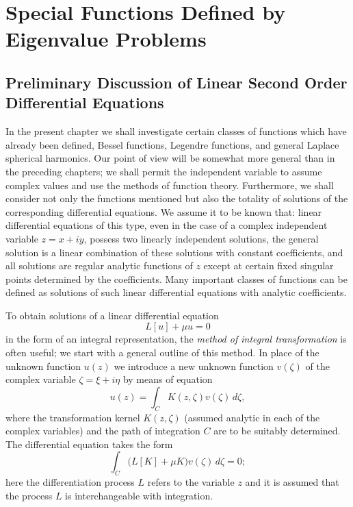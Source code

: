 \chapter{Special Functions Defined by Eigenvalue Problems}

\section{Preliminary Discussion of Linear Second Order Differential Equations}
In the present chapter we shall investigate certain classes of functions which have already been defined, Bessel functions, Legendre functions, and general Laplace spherical harmonics. Our point of view will be somewhat more general than in the preceding chapters; we shall permit the independent variable to assume complex values and use the methods of function theory. Furthermore, we shall consider not only the functions mentioned but also the totality of solutions of the corresponding differential equations. We assume it to be known that: linear differential equations of this type, even in the case of a complex independent variable $z=x+iy$, possess two linearly independent solutions, the general solution is a linear combination of these solutions with constant coefficients, and all solutions are regular analytic functions of $z$ except at certain fixed singular points determined by the coefficients. Many important classes of functions can be defined as solutions of such linear differential equations with analytic coefficients.

To obtain solutions of a linear differential equation
\[
L[u]+\mu u=0
\]
in the form of an integral representation, the \emph{method of integral transformation} is often useful; we start with a general outline of this method. In place of the unknown function $u(z)$ we introduce a new unknown function $v(\zeta)$ of the complex variable $\zeta=\xi+i\eta$ by means of equation
\begin{equation}\tag{1}
u(z)=\int_CK(z,\zeta)v(\zeta)\,d\zeta,
\end{equation}
where the transformation kernel $K(z,\zeta)$ (assumed analytic in each of the complex variables) and the path of integration $C$ are to be suitably determined. The differential equation takes the form
\[
\int_C\bigl(L[K]+\mu K\bigr)v(\zeta)\,d\zeta=0;
\]
here the differentiation process $L$ refers to the variable $z$ and it is assumed that the process $L$ is interchangeable with integration.

